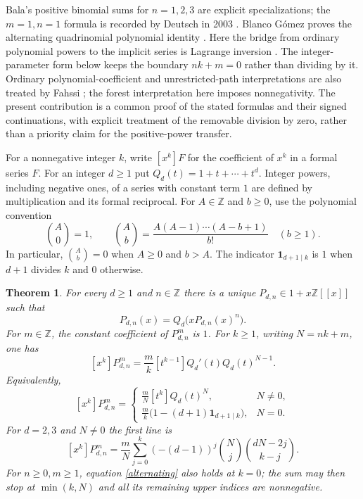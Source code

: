 \documentclass[11pt]{article}
\newtheorem{theorem}{Theorem}
\newcommand{\coef}[2]{[#1^{#2}]}
\begin{document}
Bala's positive binomial sums for $n=1,2,3$ \cite{bala1,bala2,bala3}
are explicit specializations; the $m=1,n=1$ formula is recorded
by Deutsch in 2003 \cite{bala1}. Blanco G\'omez proves the alternating
quadrinomial polynomial identity \cite[Section 2]{blanco}.
Here the bridge from ordinary polynomial powers to the implicit series is
Lagrange inversion \cite[Theorem 2.1.1, equation (2.1.1)]{gessel}.
The integer-parameter form below keeps the boundary $nk+m=0$ rather than
dividing by it. Ordinary polynomial-coefficient and unrestricted-path
interpretations are also treated by Fahssi \cite[Sections 1--2]{fahssi};
the forest interpretation here imposes nonnegativity. The present
contribution is a common proof of the stated formulas and their signed
continuations, with explicit treatment of the removable division by zero,
rather than a priority claim for the positive-power transfer.

For a nonnegative integer $k$, write $\coef{x}{k}F$ for the coefficient
of $x^k$ in a formal series $F$.
For an integer $d\geq1$ put $Q_d(t)=1+t+\cdots+t^d$.
Integer powers, including negative ones, of a series with constant term
$1$ are defined by multiplication and its formal reciprocal. For $A\in\mathbb Z$
and $b\geq0$, use the polynomial convention
\[
 \binom A0=1,\qquad
 \binom Ab=\frac{A(A-1)\cdots(A-b+1)}{b!}\quad(b\geq1).
\]
In particular, $\binom Ab=0$ when $A\geq0$ and $b>A$.
The indicator $\mathbf1_{d+1\mid k}$ is $1$ when $d+1$ divides $k$
and $0$ otherwise.

\begin{theorem}\label{main}
For every $d\geq1$ and $n\in\mathbb Z$ there is a unique
$P_{d,n}\in1+x\mathbb Z[[x]]$ such that
\begin{equation}\label{native}
 P_{d,n}(x)=Q_d\bigl(xP_{d,n}(x)^n\bigr).
\end{equation}
For $m\in\mathbb Z$, the constant coefficient of $P_{d,n}^m$ is $1$.
For $k\geq1$, writing $N=nk+m$, one has
\begin{equation}\label{denominatorfree}
 \coef{x}{k}P_{d,n}^m
   =\frac{m}{k}\coef{t}{k-1}Q_d'(t)Q_d(t)^{N-1}.
\end{equation}
Equivalently,
\begin{equation}\label{boundary}
 \coef{x}{k}P_{d,n}^m=
 \begin{cases}
 \displaystyle\frac{m}{N}\coef{t}{k}Q_d(t)^N,&N\ne0,\\[6pt]
 \displaystyle\frac{m}{k}\bigl(1-(d+1)\mathbf1_{d+1\mid k}\bigr),&N=0.
 \end{cases}
\end{equation}
For $d=2,3$ and $N\ne0$ the first line is
\begin{equation}\label{alternating}
 \coef{x}{k}P_{d,n}^m
 =\frac{m}{N}\sum_{j=0}^{k}
 (-(d-1))^j\binom Nj\binom{dN-2j}{k-j}.
\end{equation}
For $n\geq0,m\geq1$, equation \eqref{alternating} also holds at $k=0$;
the sum may then stop at $\min(k,N)$ and all its remaining upper indices
are nonnegative.
\end{theorem}
\end{document}
